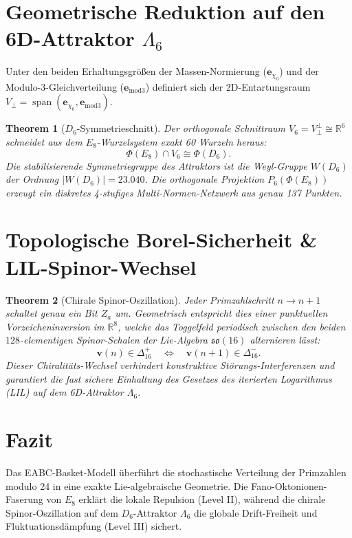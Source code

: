 \documentclass[11pt,a4paper]{article}
\newtheorem{theorem}{Theorem}[section]
\begin{document}
\section{Geometrische Reduktion auf den 6D-Attraktor $\Lambda_6$}

Unter den beiden Erhaltungsgrößen der Massen-Normierung ($\mathbf{e}_{\chi_0}$) und der Modulo-3-Gleichverteilung ($\mathbf{e}_{\text{mod3}}$) definiert sich der 2D-Entartungsraum $V_\perp = \operatorname{span}(\mathbf{e}_{\chi_0}, \mathbf{e}_{\text{mod3}})$.

\begin{theorem}[$D_6$-Symmetrieschnitt]
Der orthogonale Schnittraum $V_6 = V_\perp^\perp \cong \mathbb{R}^6$ schneidet aus dem $E_8$-Wurzelsystem exakt 60 Wurzeln heraus:
\begin{equation}
\Phi(E_8) \cap V_6 \cong \Phi(D_6).
\end{equation}
Die stabilisierende Symmetriegruppe des Attraktors ist die Weyl-Gruppe $W(D_6)$ der Ordnung $|W(D_6)| = 23.040$. Die orthogonale Projektion $P_6(\Phi(E_8))$ erzeugt ein diskretes 4-stufiges Multi-Normen-Netzwerk aus genau 137 Punkten.
\end{theorem}

\section{Topologische Borel-Sicherheit & LIL-Spinor-Wechsel}

\begin{theorem}[Chirale Spinor-Oszillation]
Jeder Primzahlschritt $n \to n+1$ schaltet genau ein Bit $Z_a$ um. Geometrisch entspricht dies einer punktuellen Vorzeicheninversion im $\mathbb{R}^8$, welche das Toggelfeld periodisch zwischen den beiden $128$-elementigen Spinor-Schalen der Lie-Algebra $\mathfrak{so}(16)$ alternieren lässt:
\begin{equation}
\mathbf{v}(n) \in \Delta_{16}^+ \quad \Longleftrightarrow \quad \mathbf{v}(n+1) \in \Delta_{16}^-.
\end{equation}
Dieser Chiralitäts-Wechsel verhindert konstruktive Störungs-Interferenzen und garantiert die fast sichere Einhaltung des Gesetzes des iterierten Logarithmus (LIL) auf dem 6D-Attraktor $\Lambda_6$.
\end{theorem}

\section{Fazit}

Das EABC-Basket-Modell überführt die stochastische Verteilung der Primzahlen modulo 24 in eine exakte Lie-algebraische Geometrie. Die Fano-Oktonionen-Faserung von $E_8$ erklärt die lokale Repulsion (Level II), während die chirale Spinor-Oszillation auf dem $D_6$-Attraktor $\Lambda_6$ die globale Drift-Freiheit und Fluktuationsdämpfung (Level III) sichert.
\end{document}
